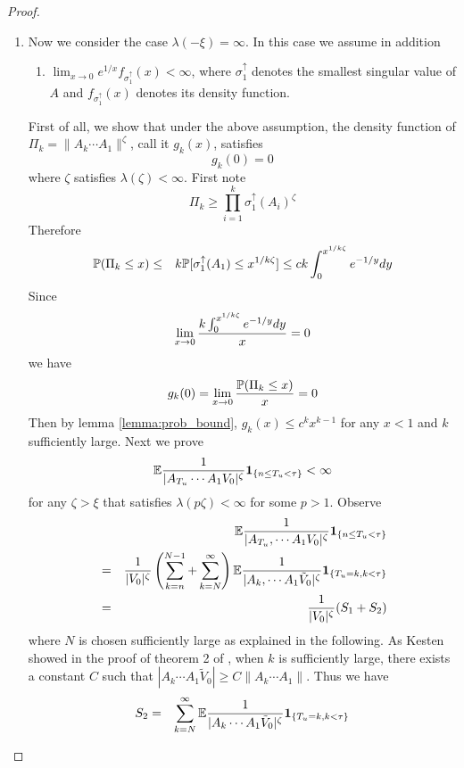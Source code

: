 \documentclass{article}
\theoremstyle{remark}
\begin{document}
\begin{proof}
\begin{enumerate}
  \item Now we consider the case $\lambda(-\xi) = \infty$. In this
    case we assume in addition
    \begin{enumerate}
    \item $\lim_{x \to 0} e^{1/x} f_{\sigma_1^{\uparrow}}(x)  <
      \infty$, where $\sigma_1^{\uparrow}$ denotes the smallest
      singular value of $A$ and $f_{\sigma_1^{\uparrow}}(x)$ denotes its
      density function.
    \end{enumerate}
    First of all, we show that under the above assumption, the density
    function of $\Pi_k = \|A_k \cdots A_1\|^\zeta$, call it $g_k(x)$,
    satisfies
    \[
    g_k(0) = 0
    \]
    where $\zeta$ satisfies $\lambda(\zeta) < \infty$. First note
    \[
    \Pi_k \geq \prod_{i=1}^k \sigma_1^{\uparrow}(A_i)^\zeta
    \]
    Therefore
    \begin{eqnarray*}
      \P(\Pi_k \leq x) &\leq& k \P[\sigma_1^{\uparrow}(A_1)
      \leq x^{1/k \zeta}] \leq c k \int_0^{x^{1/k\zeta}} e^{-1/y} dy
    \end{eqnarray*}
    Since
    \[
    \lim_{x \to 0} {k \int_0^{x^{1/k\zeta}} e^{-1/y} dy \over x} = 0
    \]
    we have
    \[
    g_k(0) = \lim_{x \to 0} {\P(\Pi_k \leq x) \over x} = 0
    \]
    Then by lemma \ref{lemma:prob_bound}, $g_k(x) \leq c^k x^{k-1}$
    for any $x < 1$ and $k$ sufficiently large. Next we prove
    \[
    \E {1 \over |A_{T_u} \cdots A_1 V_0|^\zeta}\1{n \leq T_u < \tau} < \infty
    \]
    for any $\zeta > \xi$ that satisfies $\lambda(p\zeta) < \infty$ for some
    $p > 1$. Observe
    \begin{eqnarray*}
      && \E {1 \over |A_{T_u}, \cdots A_1 V_0|^\zeta} \1{n \leq T_u < \tau}\\
      &=& {1 \over |V_0|^{\zeta}} \left(
        \sum_{k=n}^{N-1} + \sum_{k=N}^\infty
      \right) \E {1 \over |A_k, \cdots A_1 \tilde V_0|^{\zeta}}
      \1{T_u = k, k < \tau} \\
      &=& {1 \over |V_0|^{\zeta}}(S_1 + S_2)
      \end{eqnarray*}
      where $N$ is chosen sufficiently large as explained in the following. As
      Kesten showed in the proof of theorem 2 of \cite{Kesten1973},
      when $k$ is sufficiently large, there exists a constant $C$ such
      that $|A_k \cdots A_1 \tilde V_0| \geq C \|A_k \cdots A_1\|$. Thus we have
      \begin{eqnarray*}
        S_2 &=& \sum_{k=N}^{\infty}
        \E {1 \over |A_k \cdots A_1  \tilde V_0|^\zeta}
        \1{T_u = k, k < \tau} \\

\end{eqnarray*}
\end{enumerate}
\end{proof}
\end{document}
